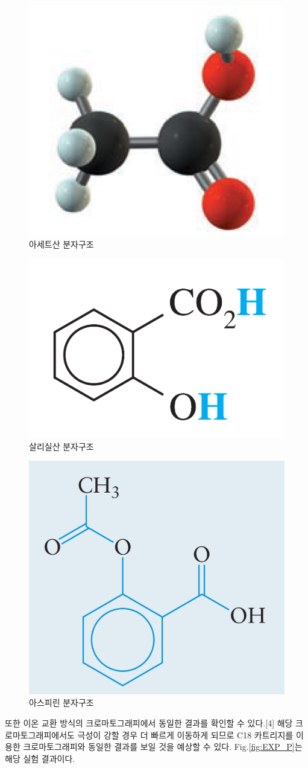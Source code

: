 \documentclass[%
 reprint,
 amsmath,amssymb,
 aps,
]{revtex4-2}
\begin{document}
\begin{figure}[htbp]
	\includegraphics[width = 0.5\linewidth]{acet.png}%
	\caption{\label{fig:acet}아세트산 분자구조}
\end{figure}
\begin{figure}[htbp]
	\includegraphics[width = 0.5\linewidth]{saly.png}%
	\caption{\label{fig:saly}살리실산 분자구조}
\end{figure}
\begin{figure}[htbp]
	\includegraphics[width = 0.5\linewidth]{aspirin.png}%
	\caption{\label{fig:aspirin}아스피린 분자구조}
\end{figure}

또한 이온 교환 방식의 크로마토그래피에서 동일한 결과를 확인할 수 있다.[4] 해당 크로마토그래피에서도 극성이 강할 경우 더 빠르게 이동하게 되므로 C18 카트리지를 이용한 크로마토그래피와 동일한 결과를 보일 것을 예상할 수 있다. Fig.\ref{fig:EXP_P}는 해당 실험 결과이다.
\end{document}
